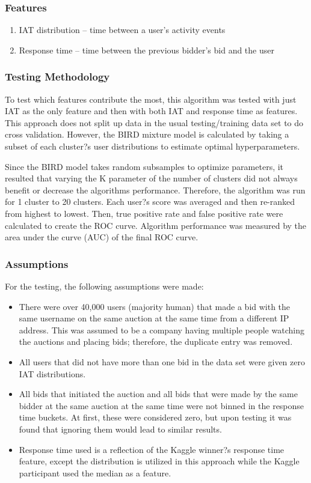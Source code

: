 \documentclass{article} %
\begin{document}
\subsubsection{Features}

\begin{enumerate}
\item IAT distribution -- time between a user's activity events
\item Response time -- time between the previous bidder's bid and the user
\end{enumerate}

\subsubsection{Testing Methodology}

To test which features contribute the most, this algorithm was tested with just IAT as the only feature and then with both IAT and response time as features.
This approach does not split up data in the usual testing/training data set to do cross validation.
However, the BIRD mixture model is calculated by taking a subset of each cluster?s user distributions to estimate optimal hyperparameters.

Since the BIRD model takes random subsamples to optimize parameters, it resulted that varying the K parameter of the number of clusters did not always benefit or decrease the algorithms performance.
Therefore, the algorithm was run for 1 cluster to 20 clusters.
Each user?s score was averaged and then re-ranked from highest to lowest.
Then, true positive rate and false positive rate were calculated to create the ROC curve.
Algorithm performance was measured by the area under the curve (AUC) of the final ROC curve.

\subsubsection{Assumptions}

For the testing, the following assumptions were made:

\begin{itemize}
\item There were over 40,000 users (majority human) that made a bid with the same username on the same auction at the same time from a different IP address.
This was assumed to be a company having multiple people watching the auctions and placing bids; therefore, the duplicate entry was removed.
\item All users that did not have more than one bid in the data set were given zero IAT distributions.
\item All bids that initiated the auction and all bids that were made by the same bidder at the same auction at the same time were not binned in the response time buckets.
At first, these were considered zero, but upon testing it was found that ignoring them would lead to similar results.
\item Response time used is a reflection of the Kaggle winner?s response time feature, except the distribution is utilized in this approach while the Kaggle participant used the median as a feature.
\end{itemize}
\end{document}
